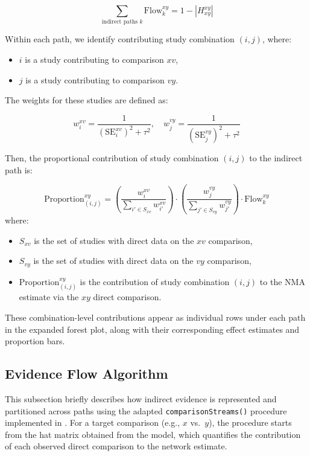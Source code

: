 \[
\sum_{\text{indirect paths } k} \mathrm{Flow}^{xy}_k = 1 - \left| H^{xy}_{xy} \right|
\]

Within each path, we identify contributing study combination $(i, j)$, where:
\begin{itemize}
  \item $i$ is a study contributing to comparison $xv$,
  \item $j$ is a study contributing to comparison $vy$.
\end{itemize}

The weights for these studies are defined as:

\[
w_i^{xv} = \frac{1}{\left( \mathrm{SE}_i^{xv} \right)^2 + \tau^2}, \quad
w_j^{vy} = \frac{1}{\left( \mathrm{SE}_j^{vy} \right)^2 + \tau^2}
\]

Then, the proportional contribution of study combination $(i, j)$ to the indirect path is:

\[
\text{Proportion}_{(i,j)}^{xy} =
\left( \frac{w_i^{xv}}{\sum_{i' \in S_{xv}} w_{i'}^{xv}} \right)
\cdot
\left( \frac{w_j^{vy}}{\sum_{j' \in S_{vy}} w_{j'}^{vy}} \right)
\cdot \mathrm{Flow}^{xy}_k
\]
where:
\begin{itemize}
  \item $S_{xv}$ is the set of studies with direct data on the $xv$ comparison,
  \item $S_{vy}$ is the set of studies with direct data on the $vy$ comparison,
  \item $\text{Proportion}_{(i,j)}^{xy}$ is the contribution of study combination $(i, j)$ to the NMA estimate via the $xy$ direct comparison.
\end{itemize}

These combination-level contributions appear as individual rows under each path in the expanded forest plot, along with their corresponding effect estimates and proportion bars.

\subsection{Evidence Flow Algorithm}
This subsection briefly describes how indirect evidence is represented and partitioned across paths using the adapted \texttt{comparisonStreams()} procedure implemented in . For a target comparison (e.g., $x$ vs.\ $y$), the procedure starts from the hat matrix obtained from the  model, which quantifies the contribution of each observed direct comparison to the network estimate.

